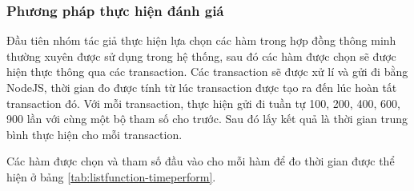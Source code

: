 \documentclass[../main-report.tex]{subfiles}
\begin{document}
\subsubsection{Phương pháp thực hiện đánh giá}
Đầu tiên nhóm tác giả thực hiện lựa chọn các hàm trong hợp đồng thông minh thường xuyên được sử dụng trong hệ thống, sau đó các hàm được chọn sẽ được hiện thực thông qua các \gls{transaction}. Các \gls{transaction} sẽ được xử lí và gửi đi bằng NodeJS, thời gian đo được tính từ lúc \gls{transaction} được tạo ra đến lúc hoàn tất \gls{transaction} đó. Với mỗi \gls{transaction}, thực hiện gửi đi tuần tự 100, 200, 400, 600, 900 lần với cùng một bộ tham số cho trước. Sau đó lấy kết quả là thời gian trung bình thực hiện cho mỗi \gls{transaction}.

Các hàm được chọn và tham số đầu vào cho mỗi hàm để đo thời gian được thể hiện ở bảng \ref{tab:listfunction-timeperform}.
\end{document}
